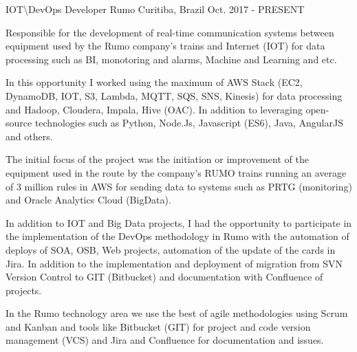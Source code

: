 

\begin{cventries}
  \cventry
    { IOT\textbackslash DevOps Developer} %
    {Rumo} %
    {Curitiba, Brazil} %
    {Oct. 2017 - PRESENT} %
    {
    \begin{cvitems} %
        \item {
Responsible for the development of real-time communication systems between equipment used by the Rumo company's trains and Internet (IOT) for data processing such as BI, monotoring and alarms, Machine and Learning and etc.
}
       \item {In this opportunity I worked using the maximum of AWS Stack (EC2, DynamoDB, IOT, S3, Lambda, MQTT, SQS, SNS, Kinesis) for data processing and Hadoop, Cloudera, Impala, Hive (OAC). In addition to leveraging open-source technologies such as Python, Node.Js, Javascript (ES6), Java, AngularJS and others.}
        \item {The initial focus of the project was the initiation or improvement of the equipment used in the route by the company's RUMO trains running an average of 3 million rules in AWS for sending data to systems such as PRTG (monitoring) and Oracle Analytics Cloud (BigData).}
          \item {In addition to IOT and Big Data projects, I had the opportunity to participate in the implementation of the DevOps methodology in Rumo with the automation of deploys of SOA, OSB, Web projects, automation of the update of the cards in Jira. In addition to the implementation and deployment of migration from SVN Version Control to GIT (Bitbucket) and documentation with Confluence of projects.}
        \item {In the Rumo technology area we use the best of agile methodologies using Scrum and Kanban and tools like Bitbucket (GIT) for project and code version management (VCS) and Jira and Confluence for documentation and issues.}
      \end{cvitems}
    }

\end{cventries}
